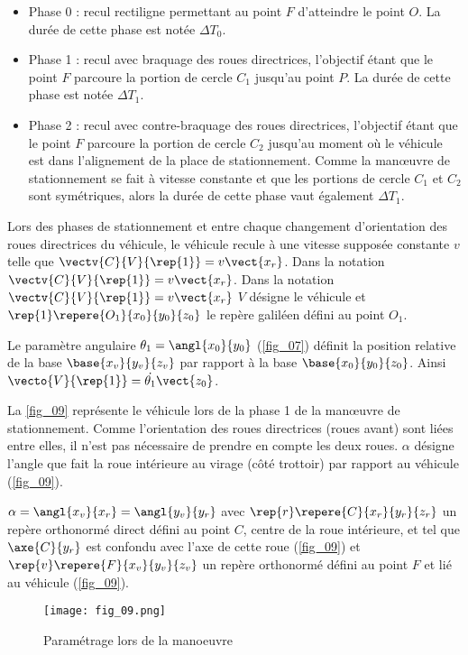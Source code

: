 \begin{itemize}
\item Phase 0 : recul rectiligne permettant au point $F$ d’atteindre le point $O$. La durée de cette phase est notée $\Delta T_0$.
\item Phase 1 : recul avec braquage des roues directrices, l’objectif étant que le point $F$ parcoure la portion de
cercle $C_1$ jusqu’au point $P$. La durée de cette phase est notée $\Delta T_1$.
\item Phase 2 : recul avec contre-braquage des roues directrices, l’objectif étant que le point $F$ parcoure la portion
de cercle $C_2$ jusqu’au moment où le véhicule est dans l’alignement de la place de stationnement. Comme la
manœuvre de stationnement se fait à vitesse constante et que les portions de cercle $C_1$
et $C_2$ sont symétriques, alors la durée de cette phase vaut également $\Delta T_1$.
\end{itemize}
Lors des phases de stationnement et entre chaque changement d’orientation des roues directrices du véhicule,
le véhicule recule à une vitesse supposée constante $v$ telle que $\vectv{C}{V}{\rep{1}}=v\vect{x_r}$. Dans la notation
$\vectv{C}{V}{\rep{1}}=v\vect{x_r}$. 
Dans la notation $\vectv{C}{V}{\rep{1}}=v\vect{x_r}$ $V$ désigne le véhicule et $\rep{1}\repere{O_1}{x_0}{y_0}{z_0}$
le repère galiléen défini au point $O_1$.

Le paramètre angulaire $\theta_1 = \angl{x_0}{y_0}$ (\autoref{fig_07}) définit la position relative de la base $\base{x_v}{y_v}{z_v}$
par rapport à la base $\base{x_0}{y_0}{z_0}$. Ainsi $\vecto{V}{\rep{1}} = \dot{\theta_1}\vect{z_0}$.

La \autoref{fig_09} représente le véhicule lors de la phase 1 de la manœuvre de stationnement. Comme l’orientation des
roues directrices (roues avant) sont liées entre elles, il n’est pas nécessaire de prendre en compte les deux roues.
$\alpha$ désigne l’angle que fait la roue intérieure au virage (côté trottoir) par rapport au véhicule (\autoref{fig_09}).

 $\alpha = \angl{x_v}{x_r}=\angl{y_v}{y_r}$
 avec $\rep{r} \repere{C}{x_r}{y_r}{z_r}$ 
un repère orthonormé direct défini au point $C$, centre de la roue intérieure, et tel que $\axe{C}{y_r}$ est confondu avec l’axe de cette roue (\autoref{fig_09}) et $\rep{v}\repere{F}{x_v}{y_v}{z_v}$ un repère
orthonormé défini au point $F$ et lié au véhicule (\autoref{fig_09}).


\begin{figure}[H]
\centering
\texttt{[image: fig\_09.png]}
\caption{Paramétrage lors de la manoeuvre \label{fig_09}}
\end{figure}

